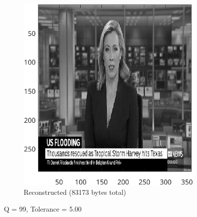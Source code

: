 \documentclass{article}
\begin{document}
\begin{figure}[ht]
\begin{subfigure}[t]{0.45\textwidth}
			\includegraphics[width=\textwidth]{2B_Input5Reconstructed}

			\caption{Reconstructed (83173 bytes total)}
			\label{fig:2B_Input5Reconstructed}

		\end{subfigure}

		\caption{Q = 99, Tolerance = 5.00}
		\label{fig:2B_Input5}
	\end{figure}
\end{document}
